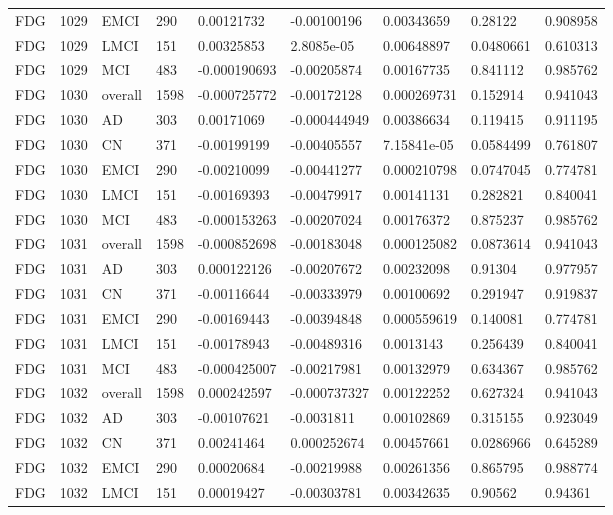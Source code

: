 \begin{landscape}
\begin{longtable}{lllllllll}
FDG & 1029 & EMCI & 290 & 0.00121732 & -0.00100196 & 0.00343659 & 0.28122 & 0.908958 \\
FDG & 1029 & LMCI & 151 & 0.00325853 & 2.8085e-05 & 0.00648897 & 0.0480661 & 0.610313 \\
FDG & 1029 & MCI & 483 & -0.000190693 & -0.00205874 & 0.00167735 & 0.841112 & 0.985762 \\
FDG & 1030 & overall & 1598 & -0.000725772 & -0.00172128 & 0.000269731 & 0.152914 & 0.941043 \\
FDG & 1030 & AD & 303 & 0.00171069 & -0.000444949 & 0.00386634 & 0.119415 & 0.911195 \\
FDG & 1030 & CN & 371 & -0.00199199 & -0.00405557 & 7.15841e-05 & 0.0584499 & 0.761807 \\
FDG & 1030 & EMCI & 290 & -0.00210099 & -0.00441277 & 0.000210798 & 0.0747045 & 0.774781 \\
FDG & 1030 & LMCI & 151 & -0.00169393 & -0.00479917 & 0.00141131 & 0.282821 & 0.840041 \\
FDG & 1030 & MCI & 483 & -0.000153263 & -0.00207024 & 0.00176372 & 0.875237 & 0.985762 \\
FDG & 1031 & overall & 1598 & -0.000852698 & -0.00183048 & 0.000125082 & 0.0873614 & 0.941043 \\
FDG & 1031 & AD & 303 & 0.000122126 & -0.00207672 & 0.00232098 & 0.91304 & 0.977957 \\
FDG & 1031 & CN & 371 & -0.00116644 & -0.00333979 & 0.00100692 & 0.291947 & 0.919837 \\
FDG & 1031 & EMCI & 290 & -0.00169443 & -0.00394848 & 0.000559619 & 0.140081 & 0.774781 \\
FDG & 1031 & LMCI & 151 & -0.00178943 & -0.00489316 & 0.0013143 & 0.256439 & 0.840041 \\
FDG & 1031 & MCI & 483 & -0.000425007 & -0.00217981 & 0.00132979 & 0.634367 & 0.985762 \\
FDG & 1032 & overall & 1598 & 0.000242597 & -0.000737327 & 0.00122252 & 0.627324 & 0.941043 \\
FDG & 1032 & AD & 303 & -0.00107621 & -0.0031811 & 0.00102869 & 0.315155 & 0.923049 \\
FDG & 1032 & CN & 371 & 0.00241464 & 0.000252674 & 0.00457661 & 0.0286966 & 0.645289 \\
FDG & 1032 & EMCI & 290 & 0.00020684 & -0.00219988 & 0.00261356 & 0.865795 & 0.988774 \\
FDG & 1032 & LMCI & 151 & 0.00019427 & -0.00303781 & 0.00342635 & 0.90562 & 0.94361 \\

\end{longtable}
\end{landscape}
